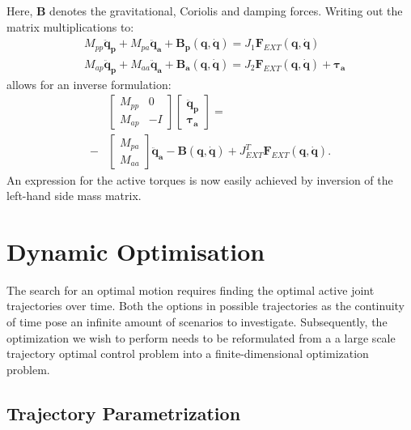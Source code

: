 \documentclass[letterpaper, 10 pt, conference]{ieeeconf}  %
\begin{document}
Here, $\mathbf{B}$ denotes the gravitational, Coriolis and damping forces. Writing out the matrix multiplications to:
\begin{equation}
\begin{aligned}
&M_{pp} \mathbf{\ddot q_p}+M_{pa} \mathbf{\ddot q_a} + \mathbf{B_p (q,\dot q)} = J_1 \mathbf{F}_{EXT}\mathbf{(q, \dot q)} \\
&M_{ap} \mathbf{\ddot q_p}+M_{aa} \mathbf{\ddot q_a} + \mathbf{B_a (q,\dot q)} = J_2 \mathbf{F}_{EXT}\mathbf{(q, \dot q) + \boldsymbol{\tau_a}} 
\end{aligned}
\end{equation}
allows for an inverse formulation:
\begin{equation}
\begin{aligned}
&\left[\begin{array}{cc}  
M_{pp} & 0\\
M_{ap} &-I
\end{array} \right]
\left[\begin{array}{c}  
\mathbf{\ddot q_p}\\
\boldsymbol{\tau_a}
\end{array} \right] =\\ 
-&
\left[\begin{array}{c}  
M_{pa}\\
M_{aa}
\end{array} \right] 
\mathbf{\ddot q_a}-
\mathbf{B(q, \dot q)}+
J_{EXT}^T\mathbf{F}_{EXT}\mathbf{(q, \dot q)}.
\end{aligned}
\end{equation}	
An expression for the active torques is now easily achieved by inversion of the left-hand side mass matrix. 

\section{Dynamic Optimisation}

The search for an optimal motion requires finding the optimal active joint trajectories over time. Both the options in possible trajectories as the continuity of time pose an infinite amount of scenarios to investigate. Subsequently, the optimization we wish to perform needs to be reformulated from a a large scale trajectory optimal control problem into a finite-dimensional optimization problem.


\subsection{Trajectory Parametrization}
\end{document}

